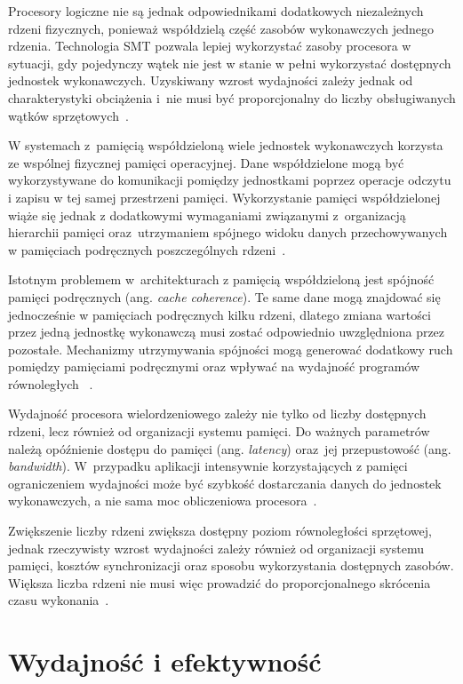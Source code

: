 Procesory logiczne nie są jednak odpowiednikami dodatkowych niezależnych rdzeni fizycznych, ponieważ współdzielą część zasobów wykonawczych 
jednego rdzenia. Technologia SMT pozwala lepiej wykorzystać zasoby procesora w sytuacji, gdy pojedynczy wątek nie jest w stanie 
w pełni wykorzystać dostępnych jednostek wykonawczych. Uzyskiwany wzrost wydajności zależy jednak od charakterystyki obciążenia 
i~nie musi być proporcjonalny do liczby obsługiwanych wątków sprzętowych~\cite{bib:Hennessy}.

W systemach z~pamięcią współdzieloną wiele jednostek wykonawczych korzysta ze wspólnej fizycznej pamięci operacyjnej. 
Dane współdzielone mogą być wykorzystywane do komunikacji pomiędzy jednostkami poprzez operacje odczytu i zapisu w tej samej przestrzeni pamięci. 
Wykorzystanie pamięci współdzielonej wiąże się jednak z dodatkowymi wymaganiami związanymi z~organizacją hierarchii pamięci 
oraz~utrzymaniem spójnego widoku danych przechowywanych w pamięciach podręcznych poszczególnych rdzeni~\cite{bib:Hennessy,bib:Grama}.

Istotnym problemem w~architekturach z pamięcią współdzieloną jest spójność pamięci podręcznych 
(ang. \textit{cache coherence}). Te same dane mogą znajdować się jednocześnie w pamięciach podręcznych kilku rdzeni, 
dlatego zmiana wartości przez jedną jednostkę wykonawczą musi zostać odpowiednio uwzględniona przez pozostałe. 
Mechanizmy utrzymywania spójności mogą generować dodatkowy ruch pomiędzy pamięciami podręcznymi oraz wpływać na wydajność programów równoległych
~\cite{bib:Hennessy}.

Wydajność procesora wielordzeniowego zależy nie tylko od liczby dostępnych rdzeni, lecz również od organizacji systemu pamięci. 
Do ważnych parametrów należą opóźnienie dostępu do pamięci (ang. \textit{latency}) oraz~jej przepustowość (ang. \textit{bandwidth}). 
W~przypadku aplikacji intensywnie korzystających z pamięci ograniczeniem wydajności może być szybkość dostarczania danych 
do jednostek wykonawczych, a nie sama moc obliczeniowa procesora~\cite{bib:Grama}.

Zwiększenie liczby rdzeni zwiększa dostępny poziom równoległości sprzętowej, jednak rzeczywisty wzrost wydajności 
zależy również od organizacji systemu pamięci, kosztów synchronizacji oraz sposobu wykorzystania dostępnych zasobów. 
Większa liczba rdzeni nie musi więc prowadzić do proporcjonalnego skrócenia czasu wykonania~\cite{bib:Grama,bib:Hennessy}.

\section{Wydajność i efektywność}
\label{sec:WydajnoscEfektywnosc}

